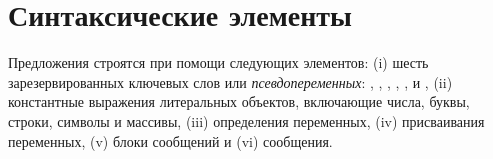 \documentclass[a4paper,10pt,twoside]{book}
\begin{document}
\section{Синтаксические элементы}

Предложения строятся при помощи следующих элементов:
(i) шесть зарезервированных ключевых слов или \emph{псевдопеременных}:
	, , , , , и ,
(ii) константные выражения литеральных объектов, включающие числа, буквы, строки, символы и массивы,
(iii) определения переменных,
(iv) присваивания переменных,
(v) блоки сообщений и
(vi) сообщения.
\end{document}
